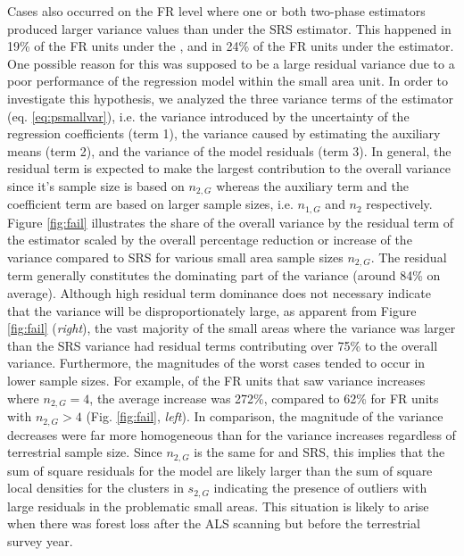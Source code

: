 Cases also occurred on the FR level where one or both two-phase estimators produced larger variance values than under the SRS estimator. This happened in 19\% of the FR units under the \extpsynth{}, and in 24\% of the FR units under the \psmall{} estimator. One possible reason for this was supposed to be a large residual variance due to a poor performance of the regression model within the small area unit. In order to investigate this hypothesis, we analyzed the three variance terms of the \psmall{} estimator (eq. \ref{eq:psmallvar}), i.e. the variance introduced by the uncertainty of the regression coefficients (term 1), the variance caused by estimating the auxiliary means (term 2), and the variance of the model residuals (term 3). In general, the residual term is expected to make the largest contribution to the overall variance since it's sample size is based on $n_{2,G}$ whereas the auxiliary term and the coefficient term are based on larger sample sizes, i.e. $n_{1,G}$ and $n_2$ respectively. Figure \ref{fig:fail} illustrates the share of the overall variance by the residual term of the \psmall{} estimator scaled by the overall percentage reduction or increase of the variance compared to SRS for various small area sample sizes $n_{2,G}$. The residual term generally constitutes the dominating part of the \psmall{} variance (around 84\% on average). Although high residual term dominance does not necessary indicate that the \psmall{} variance will be disproportionately large, as apparent from Figure \ref{fig:fail} (\textit{right}), the vast majority of the small areas where the \psmall{} variance was larger than the SRS variance had residual terms contributing over 75\% to the overall \psmall{} variance. Furthermore, the magnitudes of the worst cases tended to occur in lower sample sizes. For example, of the FR units that saw variance increases where $n_{2,G}=4$, the average increase was 272\%, compared to 62\% for FR units with $n_{2,G} > 4$ (Fig. \ref{fig:fail}, \textit{left}).  In comparison, the magnitude of the variance decreases were far more homogeneous than for the variance increases regardless of terrestrial sample size. Since $n_{2,G}$ is the same for \psmall{} and SRS, this implies that the sum of square residuals for the model are likely larger than the sum of square local densities for the clusters in $s_{2,G}$ indicating the presence of outliers with large residuals in the problematic small areas. This situation is likely to arise when there was forest loss after the ALS scanning but before the terrestrial survey year. %

